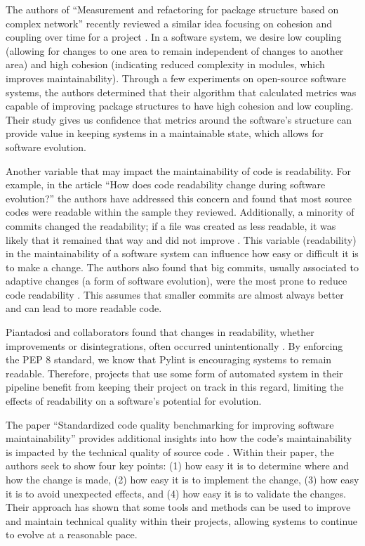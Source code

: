 \documentclass[12pt,conference]{IEEEtran}
\begin{document}

The authors of ``Measurement and refactoring for package structure based on complex network'' recently reviewed a similar idea focusing on cohesion and coupling over time for a project \cite{zhou:2020}. In a software system, we desire low coupling (allowing for changes to one area to remain independent of changes to another area) and high cohesion (indicating reduced complexity in modules, which improves maintainability). Through a few experiments on open-source software systems, the authors determined that their algorithm that calculated metrics was capable of improving package structures to have high cohesion and low coupling. Their study gives us confidence that metrics around the software's structure can provide value in keeping systems in a maintainable state, which allows for software evolution.

Another variable that may impact the maintainability of code is readability. For example, in the article ``How does code readability change during software evolution?'' the authors have addressed this concern and found that most source codes were readable within the sample they reviewed. Additionally, a minority of commits changed the readability; if a file was created as less readable, it was likely that it remained that way and did not improve \cite{piantadosi:2020}. This variable (readability) in the maintainability of a software system can influence how easy or difficult it is to make a change. The authors also found that big commits, usually associated to adaptive changes (a form of software evolution), were the most prone to reduce code readability \cite{piantadosi:2020}. This assumes that smaller commits are almost always better and can lead to more readable code.

Piantadosi and collaborators found that changes in readability, whether improvements or disintegrations, often occurred unintentionally \cite{piantadosi:2020}. By enforcing the PEP 8 standard, we know that Pylint is encouraging systems to remain readable. Therefore, projects that use some form of automated system in their pipeline benefit from keeping their project on track in this regard, limiting the effects of readability on a software's potential for evolution.

The paper ``Standardized code quality benchmarking for improving software maintainability'' provides additional insights into how the code's maintainability is impacted by the technical quality of source code \cite{baggen:2012}. Within their paper, the authors seek to show four key points: (1) how easy it is to determine where and how the change is made, (2) how easy it is to implement the change, (3) how easy it is to avoid unexpected effects, and (4) how easy it is to validate the changes. Their approach has shown that some tools and methods can be used to improve and maintain technical quality within their projects, allowing systems to continue to evolve at a reasonable pace.
\end{document}

